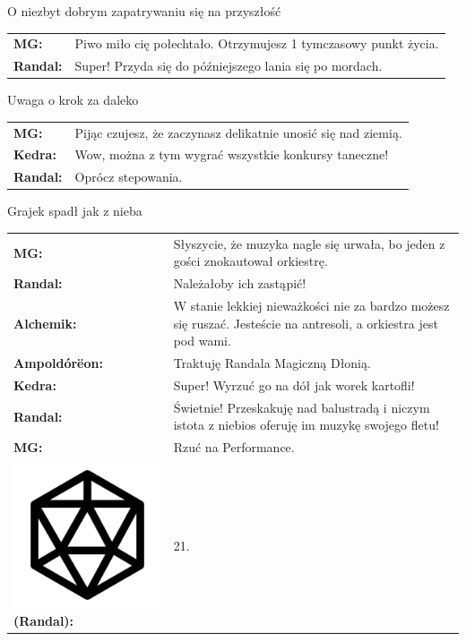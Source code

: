 \documentclass[10pt,twoside,twocolumn]{book}
\begin{document}
\begin{rpg-quotebox}{O niezbyt dobrym zapatrywaniu się na przyszłość}
   \begin{tabularx}{\columnwidth}{lX}
      \textbf{MG:} & Piwo miło cię połechtało. Otrzymujesz 1 tymczasowy punkt życia.\\
      \textbf{Randal:} & Super! Przyda się do późniejszego lania się po mordach.\\
   \end{tabularx}
\end{rpg-quotebox}


\begin{rpg-quotebox}{Uwaga o krok za daleko}
   \begin{tabularx}{\columnwidth}{lX}
      \textbf{MG:} & Pijąc czujesz, że zaczynasz delikatnie unosić się nad ziemią.\\
      \textbf{Kedra:} & Wow, można z tym wygrać wszystkie konkursy taneczne!\\
      \textbf{Randal:} & Oprócz stepowania.\\
   \end{tabularx}
\end{rpg-quotebox}


\begin{rpg-quotebox}{Grajek spadł jak z nieba}
   \begin{tabularx}{\columnwidth}{lX}
      \textbf{MG:} & Słyszycie, że muzyka nagle się urwała, bo jeden z gości znokautował orkiestrę.\\
      \textbf{Randal:} & Należałoby ich zastąpić!\\
      \textbf{Alchemik:} & W stanie lekkiej nieważkości nie za bardzo możesz się ruszać. Jesteście na antresoli, a orkiestra jest pod wami.\\
      \textbf{Ampoldórëon:} & Traktuję Randala Magiczną Dłonią.\\
      \textbf{Kedra:} & Super! Wyrzuć go na dół jak worek kartofli!\\
      \textbf{Randal:} & Świetnie! Przeskakuję nad balustradą i niczym istota z niebios oferuję im muzykę swojego fletu!\\
      \textbf{MG:} & Rzuć na Performance.\\
      \includegraphics[scale=0.055]{img/d20.png}\textbf{(Randal):}& 21.\\
   \end{tabularx}
\end{rpg-quotebox}
\end{document}
